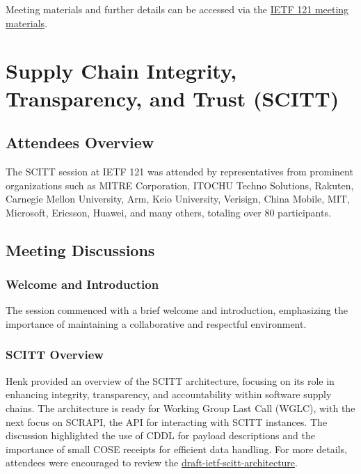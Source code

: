 \documentclass{article}
\begin{document}
Meeting materials and further details can be accessed via the \href{https://datatracker.ietf.org/meeting/121/materials.html}{IETF 121 meeting materials}.



\newpage

\section{Supply Chain Integrity, Transparency, and Trust (SCITT)}

\subsection{Attendees Overview}

The SCITT session at IETF 121 was attended by representatives from prominent organizations such as MITRE Corporation, ITOCHU Techno Solutions, Rakuten, Carnegie Mellon University, Arm, Keio University, Verisign, China Mobile, MIT, Microsoft, Ericsson, Huawei, and many others, totaling over 80 participants.

\subsection{Meeting Discussions}

\subsubsection{Welcome and Introduction}

The session commenced with a brief welcome and introduction, emphasizing the importance of maintaining a collaborative and respectful environment.

\subsubsection{SCITT Overview}

Henk provided an overview of the SCITT architecture, focusing on its role in enhancing integrity, transparency, and accountability within software supply chains. The architecture is ready for Working Group Last Call (WGLC), with the next focus on SCRAPI, the API for interacting with SCITT instances. The discussion highlighted the use of CDDL for payload descriptions and the importance of small COSE receipts for efficient data handling. For more details, attendees were encouraged to review the \href{https://datatracker.ietf.org/doc/html/draft-ietf-scitt-architecture}{draft-ietf-scitt-architecture}.
\end{document}
